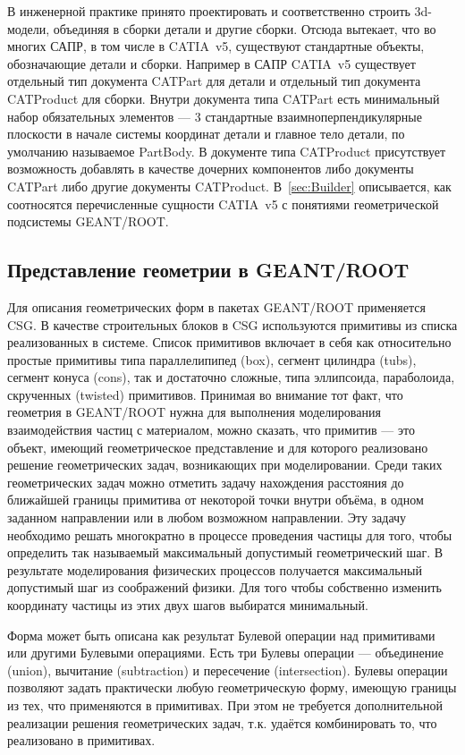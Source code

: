 В инженерной практике принято проектировать и соответственно строить 3d-модели, объединяя в сборки детали и другие сборки. Отсюда вытекает, что во многих САПР, в том числе в CATIA~v5, существуют стандартные объекты, обозначающие детали и сборки. Например в САПР CATIA~v5 существует отдельный тип документа CATPart для детали и отдельный тип документа CATProduct для сборки. Внутри документа типа CATPart есть минимальный набор обязательных элементов --- 3 стандартные взаимноперпендикулярные плоскости в начале системы координат детали и главное тело детали, по умолчанию называемое PartBody. В документе типа CATProduct присутствует возможность добавлять в качестве дочерних компонентов либо документы CATPart либо другие документы CATProduct. В~\ref{sec:Builder} описывается, как соотносятся перечисленные сущности CATIA~v5 с понятиями геометрической подсистемы GEANT/ROOT.

\subsection{Представление геометрии в GEANT/ROOT}\label{sec:geoROOT}

Для описания геометрических форм в пакетах GEANT/ROOT применяется CSG. В качестве строительных блоков в CSG используются примитивы из списка реализованных в системе. Список примитивов включает в себя как относительно простые примитивы типа параллелипипед (box), сегмент цилиндра (tubs), сегмент конуса (cons), так и достаточно сложные, типа эллипсоида, параболоида, скрученных (twisted) примитивов. Принимая во внимание тот факт, что геометрия в GEANT/ROOT нужна для выполнения моделирования взаимодействия частиц с материалом, можно сказать, что примитив --- это объект, имеющий геометрическое представление и для которого реализовано решение геометрических задач, возникающих при моделировании. Среди таких геометрических задач можно отметить задачу нахождения расстояния до ближайшей границы примитива от некоторой точки внутри объёма, в одном заданном направлении или в любом возможном направлении. Эту задачу необходимо решать многократно в процессе проведения частицы для того, чтобы определить так называемый максимальный допустимый геометрический шаг. В результате моделирования физических процессов получается максимальный допустимый шаг из соображений физики. Для того чтобы собственно изменить координату частицы из этих двух шагов выбиратся минимальный.

Форма может быть описана как результат Булевой операции над примитивами или другими Булевыми операциями. Есть три Булевы операции --- объединение (union), вычитание (subtraction) и пересечение (intersection). Булевы операции позволяют задать практически любую геометрическую форму, имеющую границы из тех, что применяются в примитивах. При этом не требуется дополнительной реализации решения геометрических задач, т.к. удаётся комбинировать то, что реализовано в примитивах.

